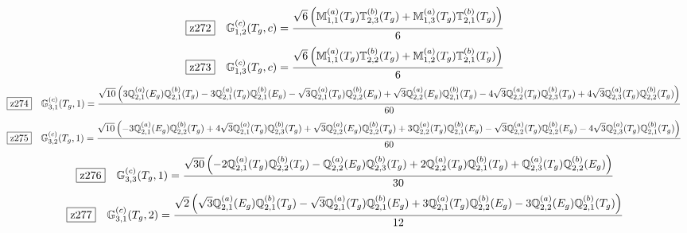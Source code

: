 \documentclass[fleqn,10pt,landscape]{jsarticle}
\begin{document}
\begin{dmath*}
\hspace*{3mm}\fbox{z272}\quad \mathbb{G}_{1,2}^{(c)}(T_{g},c)=\frac{\sqrt{6} \left(\mathbb{M}_{1,1}^{(a)}(T_{g}) \mathbb{T}_{2,3}^{(b)}(T_{g}) + \mathbb{M}_{1,3}^{(a)}(T_{g}) \mathbb{T}_{2,1}^{(b)}(T_{g})\right)}{6}
\end{dmath*}
\begin{dmath*}
\hspace*{3mm}\fbox{z273}\quad \mathbb{G}_{1,3}^{(c)}(T_{g},c)=\frac{\sqrt{6} \left(\mathbb{M}_{1,1}^{(a)}(T_{g}) \mathbb{T}_{2,2}^{(b)}(T_{g}) + \mathbb{M}_{1,2}^{(a)}(T_{g}) \mathbb{T}_{2,1}^{(b)}(T_{g})\right)}{6}
\end{dmath*}
\begin{dmath*}
\hspace*{3mm}\fbox{z274}\quad \mathbb{G}_{3,1}^{(c)}(T_{g},1)=\frac{\sqrt{10} \left(3 \mathbb{Q}_{2,1}^{(a)}(E_{g}) \mathbb{Q}_{2,1}^{(b)}(T_{g}) - 3 \mathbb{Q}_{2,1}^{(a)}(T_{g}) \mathbb{Q}_{2,1}^{(b)}(E_{g}) - \sqrt{3} \mathbb{Q}_{2,1}^{(a)}(T_{g}) \mathbb{Q}_{2,2}^{(b)}(E_{g}) + \sqrt{3} \mathbb{Q}_{2,2}^{(a)}(E_{g}) \mathbb{Q}_{2,1}^{(b)}(T_{g}) - 4 \sqrt{3} \mathbb{Q}_{2,2}^{(a)}(T_{g}) \mathbb{Q}_{2,3}^{(b)}(T_{g}) + 4 \sqrt{3} \mathbb{Q}_{2,3}^{(a)}(T_{g}) \mathbb{Q}_{2,2}^{(b)}(T_{g})\right)}{60}
\end{dmath*}
\begin{dmath*}
\hspace*{3mm}\fbox{z275}\quad \mathbb{G}_{3,2}^{(c)}(T_{g},1)=\frac{\sqrt{10} \left(- 3 \mathbb{Q}_{2,1}^{(a)}(E_{g}) \mathbb{Q}_{2,2}^{(b)}(T_{g}) + 4 \sqrt{3} \mathbb{Q}_{2,1}^{(a)}(T_{g}) \mathbb{Q}_{2,3}^{(b)}(T_{g}) + \sqrt{3} \mathbb{Q}_{2,2}^{(a)}(E_{g}) \mathbb{Q}_{2,2}^{(b)}(T_{g}) + 3 \mathbb{Q}_{2,2}^{(a)}(T_{g}) \mathbb{Q}_{2,1}^{(b)}(E_{g}) - \sqrt{3} \mathbb{Q}_{2,2}^{(a)}(T_{g}) \mathbb{Q}_{2,2}^{(b)}(E_{g}) - 4 \sqrt{3} \mathbb{Q}_{2,3}^{(a)}(T_{g}) \mathbb{Q}_{2,1}^{(b)}(T_{g})\right)}{60}
\end{dmath*}
\begin{dmath*}
\hspace*{3mm}\fbox{z276}\quad \mathbb{G}_{3,3}^{(c)}(T_{g},1)=\frac{\sqrt{30} \left(- 2 \mathbb{Q}_{2,1}^{(a)}(T_{g}) \mathbb{Q}_{2,2}^{(b)}(T_{g}) - \mathbb{Q}_{2,2}^{(a)}(E_{g}) \mathbb{Q}_{2,3}^{(b)}(T_{g}) + 2 \mathbb{Q}_{2,2}^{(a)}(T_{g}) \mathbb{Q}_{2,1}^{(b)}(T_{g}) + \mathbb{Q}_{2,3}^{(a)}(T_{g}) \mathbb{Q}_{2,2}^{(b)}(E_{g})\right)}{30}
\end{dmath*}
\begin{dmath*}
\hspace*{3mm}\fbox{z277}\quad \mathbb{G}_{3,1}^{(c)}(T_{g},2)=\frac{\sqrt{2} \left(\sqrt{3} \mathbb{Q}_{2,1}^{(a)}(E_{g}) \mathbb{Q}_{2,1}^{(b)}(T_{g}) - \sqrt{3} \mathbb{Q}_{2,1}^{(a)}(T_{g}) \mathbb{Q}_{2,1}^{(b)}(E_{g}) + 3 \mathbb{Q}_{2,1}^{(a)}(T_{g}) \mathbb{Q}_{2,2}^{(b)}(E_{g}) - 3 \mathbb{Q}_{2,2}^{(a)}(E_{g}) \mathbb{Q}_{2,1}^{(b)}(T_{g})\right)}{12}
\end{dmath*}
\end{document}
